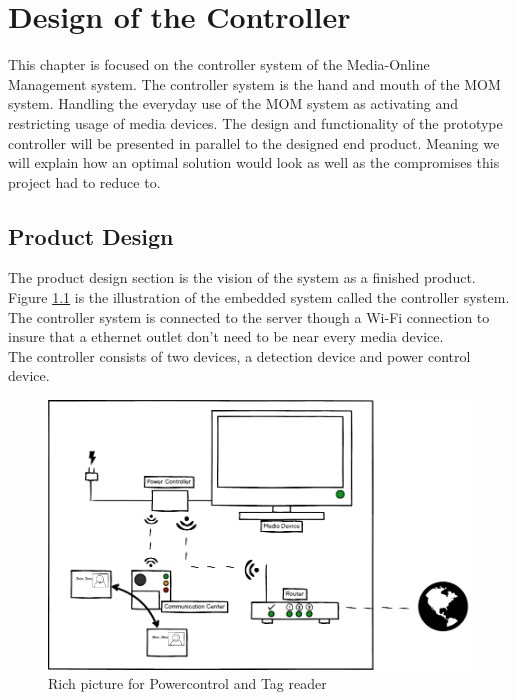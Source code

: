 \chapter{Design of the Controller}
\label{chap:controller}
This chapter is focused on the controller system of the Media-Online Management system. The controller system is the hand and mouth of the MOM system. Handling the everyday use of the MOM system as activating and restricting usage of media devices.\newline
The design and functionality of the prototype controller will be presented in parallel to the designed end product. Meaning we will explain how an optimal solution would look as well as the compromises this project had to reduce to.\newline

\section{Product Design}

The product design section is the vision of the system as a finished product. Figure \ref{fig:Power&Tagdevice} is the illustration of the embedded system called the controller system. The controller system is connected to the server though a Wi-Fi connection to insure that a ethernet outlet don't need to be near every media device. \\ 
The controller consists of two devices, a detection device and power control device.

\begin{figure}[!h]
	\centering
		\includegraphics[width=1.00\textwidth]{images/Power&Tagdevice.png}
	\caption{Rich picture for Powercontrol and Tag reader}
	\label{fig:Power&Tagdevice}
\end{figure}

